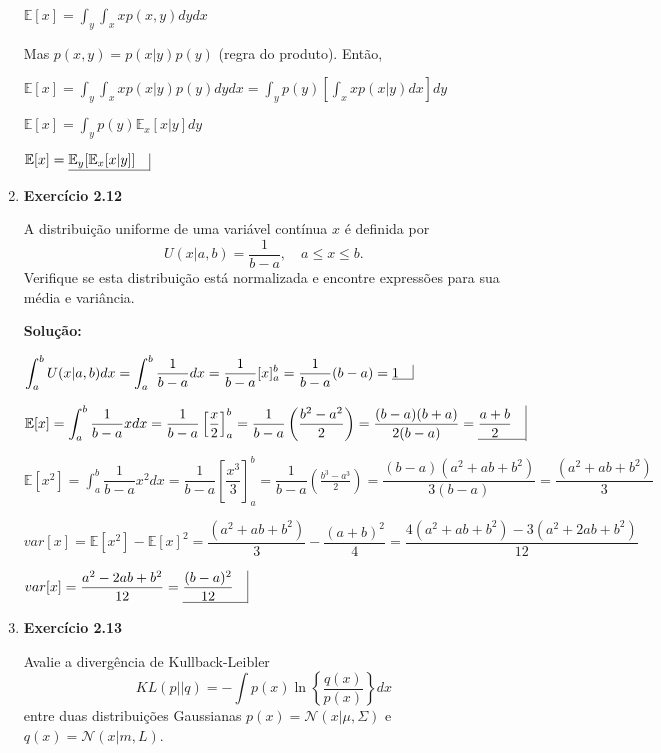 \begin{enumerate}
$ \mathbb{E}[x] = \int_y \int_x x p(x,y) dy dx $

Mas $ p(x,y) = p(x|y) p(y)$ (regra do produto). Então,

$ \mathbb{E}[x] = \int_y \int_x x p(x|y) p(y) dy dx = \int_y p(y) \left[ \int_x x p(x|y) dx \right]  dy $

$ \mathbb{E}[x] =\int_y p(y) \mathbb{E}_x[x|y] dy $

$ \mathbb{E}[x] = \underline{ \mathbb{E}_y [ \mathbb{E}_x[x|y] ] \quad} \vline $




\item \textbf{Exercício 2.12} \par
A distribuição uniforme de uma variável contínua $x$ é definida por
\begin{equation*}
    U(x|a,b) = \dfrac{1}{b-a}, \quad a\leq x \leq b.
\end{equation*}
Verifique se esta distribuição está normalizada e encontre expressões para sua média e variância.
\par
\textbf{Solução:}


$ \displaystyle  \int_a^b U(x|a,b) dx = \int_a^b \dfrac{1}{b-a} dx = \dfrac{1}{b-a} [x]_a^b = \dfrac{1}{b-a} (b-a) = \underline{ 1 \quad} \rule[-0.4ex]{0.4pt}{2.5ex} $

$ \mathbb{E}[x] = \displaystyle \int_a^b \dfrac{1}{b-a} x dx = \dfrac{1}{b-a} \left[\dfrac{x}{2}\right]_a^b = \dfrac{1}{b-a} \left(\frac{b^2-a^2}{2}\right) = \dfrac{(b-a)(b+a)}{2(b-a)} = \underline{ \dfrac{a+b}{2} \quad} \vline $

$ \mathbb{E}[x^2] = \displaystyle \int_a^b \dfrac{1}{b-a} x^2 dx = \dfrac{1}{b-a} \left[\dfrac{x^3}{3}\right]_a^b = \dfrac{1}{b-a} \left(\frac{b^3-a^3}{2}\right) = \dfrac{(b-a)(a^2+ab+b^2)}{3(b-a)} = \dfrac{(a^2+ab+b^2)}{3} $

$var[x] = \mathbb{E}[x^2] - \mathbb{E}[x]^2 = \dfrac{(a^2+ab+b^2)}{3} - \dfrac{(a+b)^2}{4} = \dfrac{4(a^2+ab+b^2) - 3 (a^2+2ab+b^2)}{12} $

$var[x] = \dfrac{a^2-2ab+b^2}{12} = \underline{ \dfrac{(b-a)^2}{12} \quad} \vline $





\item \textbf{Exercício 2.13} \par
Avalie a divergência de Kullback-Leibler 
\begin{equation*}
    KL(p || q) = - \int p(x) \ln \left\{ \frac{q(x)}{p(x)} \right\} dx
\end{equation*}
 entre duas distribuições Gaussianas $p(x) = \mathcal{N}(x|\mu, \Sigma)$ e $q(x) = \mathcal{N}(x|m, L)$.


\end{enumerate}
